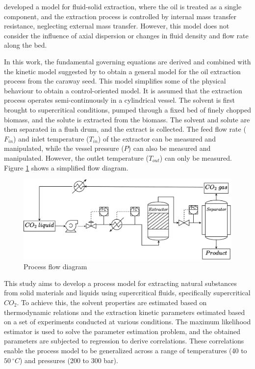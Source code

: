 \documentclass[../Article_Model_Parameters.tex]{subfiles}
\begin{document}
	\citet{Reverchon1996} developed a model for fluid-solid extraction, where the oil is treated as a single component, and the extraction process is controlled by internal mass transfer resistance, neglecting external mass transfer. However, this model does not consider the influence of axial dispersion or changes in fluid density and flow rate along the bed.
	
	In this work, the fundamental governing equations are derived and combined with the kinetic model suggested by \citet{Reverchon1996} to obtain a general model for the oil extraction process from the caraway seed. This model simplifies some of the physical behaviour to obtain a control-oriented model. It is assumed that the extraction process operates semi-continuously in a cylindrical vessel. The solvent is first brought to supercritical conditions, pumped through a fixed bed of finely chopped biomass, and the solute is extracted from the biomass. The solvent and solute are then separated in a flush drum, and the extract is collected. The feed flow rate ($F_{in}$) and inlet temperature ($T_{in}$) of the extractor can be measured and manipulated, while the vessel pressure ($P$) can also be measured and manipulated. However, the outlet temperature ($T_{out}$) can only be measured. Figure \ref{fig: SFE_drawing} shows a simplified flow diagram.
	
	\begin{figure}[h!]
		\centering
		\includegraphics[width=\columnwidth]{Figures/PFD.drawio.pdf}
		\caption{Process flow diagram}
		\label{fig: SFE_drawing}
	\end{figure}

	This study aims to develop a process model for extracting natural substances from solid materials and liquids using supercritical fluids, specifically supercritical $CO_2$. To achieve this, the solvent properties are estimated based on thermodynamic relations and the extraction kinetic parameters estimated based on a set of experiments conducted at various conditions. The maximum likelihood estimator is used to solve the parameter estimation problem, and the obtained parameters are subjected to regression to derive correlations. These correlations enable the process model to be generalized across a range of temperatures (40 to $50~^\circ C$) and pressures (200 to 300 bar).
	
\end{document}

